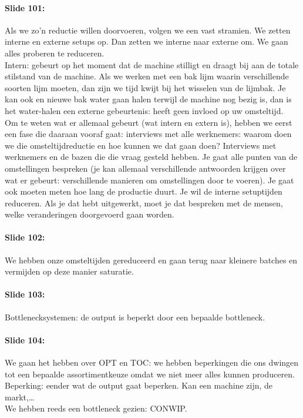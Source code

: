 \documentclass[10pt,a4paper]{report}
\begin{document}
\paragraph{Slide 101:} Als we zo'n reductie willen doorvoeren, volgen we een vast stramien. We zetten interne en externe setups op. Dan zetten we interne naar externe om.
We gaan alles proberen te reduceren. \\
Intern: gebeurt op het moment dat de machine stilligt en draagt bij aan de totale stilstand van de machine. Als we werken met een bak lijm waarin verschillende soorten lijm moeten, dan zijn we tijd kwijt bij het wisselen van de lijmbak. Je kan ook en nieuwe bak water gaan halen terwijl de machine nog bezig is, dan is het water-halen een externe gebeurtenis: heeft geen invloed op uw omsteltijd. \\
Om te weten wat er allemaal gebeurt (wat intern en extern is), hebben we eerst een fase die daaraan vooraf gaat: interviews met alle werknemers: waarom doen we die omsteltijdreductie en hoe kunnen we dat gaan doen? Interviews met werknemers en de bazen die die vraag gesteld hebben. Je gaat alle punten van de omstellingen bespreken (je kan allemaal verschillende antwoorden krijgen over wat er gebeurt: verschillende manieren om omstellingen door te voeren). Je gaat ook moeten meten hoe lang de productie duurt. Je wil de interne setuptijden reduceren. Als je dat hebt uitgewerkt, moet je dat bespreken met de mensen, welke veranderingen doorgevoerd gaan worden. 

\paragraph{Slide 102:} We hebben onze omsteltijden gereduceerd en gaan terug naar kleinere batches en vermijden op deze manier saturatie.

\paragraph{Slide 103:} Bottlenecksystemen: de output is beperkt door een bepaalde bottleneck. 

\paragraph{Slide 104:} We gaan het hebben over OPT en TOC: we hebben beperkingen die ons dwingen tot een bepaalde assortimentkeuze omdat we niet meer alles kunnen produceren.\\
Beperking: eender wat de output gaat beperken. Kan een machine zijn, de markt,…\\
We hebben reeds een bottleneck gezien: CONWIP.
\end{document}
